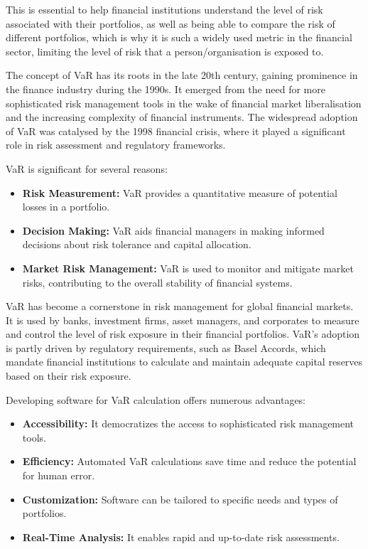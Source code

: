 \documentclass{article}
\begin{document}
This is essential to help financial institutions understand the level of risk associated with their portfolios, as well as being able to compare the risk of different portfolios, which is why it is such a widely used metric in the financial sector, limiting the level of risk that a person/organisation is exposed to.\\\vspace{0.3cm}

The concept of VaR has its roots in the late 20th century, gaining prominence in the finance industry during the 1990s. It emerged from the need for more sophisticated risk management tools in the wake of financial market liberalisation and the increasing complexity of financial instruments. The widespread adoption of VaR was catalysed by the 1998 financial crisis, where it played a significant role in risk assessment and regulatory frameworks.\\\vspace{0.3cm}


VaR is significant for several reasons:
\begin{itemize}
    \item \textbf{Risk Measurement:} VaR provides a quantitative measure of potential losses in a portfolio.
    \item \textbf{Decision Making:} VaR aids financial managers in making informed decisions about risk tolerance and capital allocation.
    \item \textbf{Market Risk Management:} VaR is used to monitor and mitigate market risks, contributing to the overall stability of financial systems.
\end{itemize}

VaR has become a cornerstone in risk management for global financial markets. It is used by banks, investment firms, asset managers, and corporates to measure and control the level of risk exposure in their financial portfolios. VaR's adoption is partly driven by regulatory requirements, such as Basel Accords, which mandate financial institutions to calculate and maintain adequate capital reserves based on their risk exposure.\\\vspace{0.3cm}


Developing software for VaR calculation offers numerous advantages:
\begin{itemize}
    \item \textbf{Accessibility:} It democratizes the access to sophisticated risk management tools.
    \item \textbf{Efficiency:} Automated VaR calculations save time and reduce the potential for human error.
    \item \textbf{Customization:} Software can be tailored to specific needs and types of portfolios.
    \item \textbf{Real-Time Analysis:} It enables rapid and up-to-date risk assessments.
\end{itemize}
\end{document}
